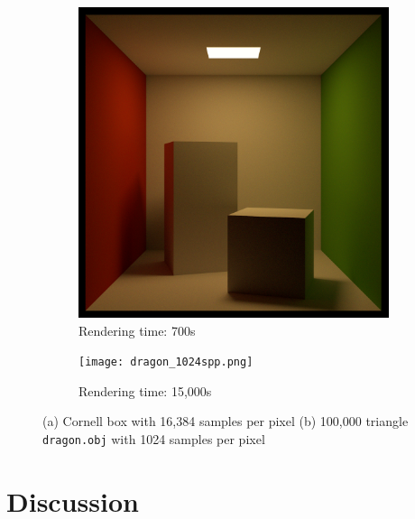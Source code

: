 \documentclass[../main.tex]{subfiles}
\begin{document}
\begin{figure}[h]
    \centering
    \begin{subfigure}{0.23\textwidth}
        \centering
        \includegraphics[width=\textwidth]{cornell_box_16384spp.png}
        \caption{Rendering time: 700s}
        \label{fig:cornell_box_16384spp}
    \end{subfigure}
    \begin{subfigure}{0.23\textwidth}
        \centering
        \texttt{[image: dragon\_1024spp.png]}
        \caption{Rendering time: 15,000s}
        \label{fig:dragon_1024spp}
    \end{subfigure}
    \caption{
        (a) Cornell box with 16,384 samples per pixel
        (b) 100,000 triangle \texttt{dragon.obj} \cite{stanford_dragon} with 1024 samples per pixel
    }
    \label{fig:cornell_box_16384spp_and_dragon_1024spp}
\end{figure}

\section{Discussion}
\end{document}
